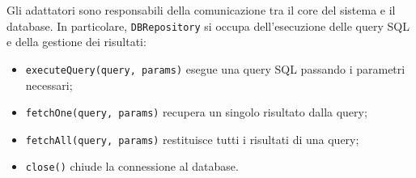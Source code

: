 Gli adattatori sono responsabili della comunicazione tra il core del sistema e il database. In particolare, \texttt{DBRepository} si occupa dell'esecuzione delle query SQL e della gestione dei risultati:
\begin{itemize}
    \item \texttt{executeQuery(query, params)} esegue una query SQL passando i parametri necessari;
    \item \texttt{fetchOne(query, params)} recupera un singolo risultato dalla query;
    \item \texttt{fetchAll(query, params)} restituisce tutti i risultati di una query;
    \item \texttt{close()} chiude la connessione al database.
\end{itemize}



